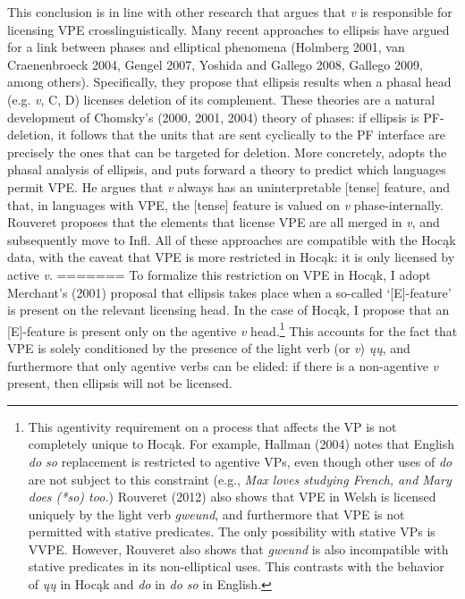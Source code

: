 \documentclass[output=paper]{LSP/langsci}
\begin{document}
This conclusion is in line with other research that argues that \emph{v} is responsible for licensing VPE crosslinguistically. Many recent approaches to ellipsis have argued for a link between phases and elliptical phenomena (Holmberg 2001, van Craenenbroeck 2004, Gengel 2007, Yoshida and Gallego 2008, Gallego 2009, among others). Specifically, they propose that ellipsis results when a phasal head (e.g. \emph{v}, C, D) licenses deletion of its complement. These theories are a natural development of Chomsky's (2000, 2001, 2004) theory of phases: if ellipsis is PF-deletion, it follows that the units that are sent cyclically to the PF interface are precisely the ones that can be targeted for deletion. More concretely, \citet{Rouveret2012} adopts the phasal analysis of ellipsis, and puts forward a theory to predict which languages permit VPE. He argues that \emph{v} always has an uninterpretable [tense] feature, and that, in languages with VPE, the [tense] feature is valued on \emph{v} phase-internally. Rouveret proposes that the elements that license VPE are all merged in \emph{v}, and subsequently move to Infl. All of these approaches are compatible with the Hocąk data, with the caveat that VPE is more restricted in Hocąk: it is only licensed by active \emph{v}.
=======
To formalize this restriction on VPE in Hoc\k{a}k, I adopt Merchant's (2001) proposal that ellipsis takes place when a so-called `[E]-feature' is present on the relevant licensing head. In the case of Hoc\k{a}k, I propose that an [E]-feature is present only on the agentive \emph{v} head.\footnote{This agentivity requirement on a process that affects the VP is not completely unique to Hoc\k{a}k. For example, Hallman (2004) notes that English \emph{do so} replacement is restricted to agentive VPs, even though other uses of \emph{do} are not subject to this constraint (e.g., \emph{Max loves studying French, and Mary does (*so) too.}) Rouveret (2012) also shows that VPE in Welsh is licensed uniquely by the light verb \emph{gweund}, and furthermore that VPE is not permitted with stative predicates. The only possibility with stative VPs is VVPE. However, Rouveret also shows that \emph{gweund} is also incompatible with stative predicates in its non-elliptical uses. This contrasts with the behavior of \emph{\k{u}\k{u}} in Hoc\k{a}k and \emph{do} in \emph{do so} in English.}  This accounts for the fact that VPE is solely conditioned by the presence of the light verb (or \emph{v}) \emph{\k{u}\k{u}}, and furthermore that only agentive verbs can be elided: if there is a non-agentive \emph{v} present, then ellipsis will not be licensed. 
\end{document}
